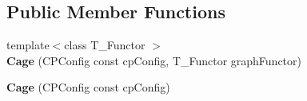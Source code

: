 \subsection*{Public Member Functions}
\begin{DoxyCompactItemize}
\item 
\hypertarget{structgraybat_1_1Cage_a4a5b4f29c8fef120674b95ac25f05518}{}{\footnotesize template$<$class T\+\_\+\+Functor $>$ }\\{\bfseries Cage} (C\+P\+Config const cp\+Config, T\+\_\+\+Functor graph\+Functor)\label{structgraybat_1_1Cage_a4a5b4f29c8fef120674b95ac25f05518}

\item 
\hypertarget{structgraybat_1_1Cage_a9e76d7d8a6dddbb5fbf6882506f80ab1}{}{\bfseries Cage} (C\+P\+Config const cp\+Config)\label{structgraybat_1_1Cage_a9e76d7d8a6dddbb5fbf6882506f80ab1}

\end{DoxyCompactItemize}
